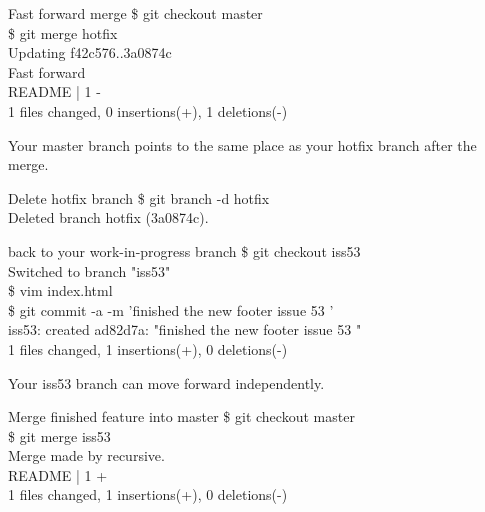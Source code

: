 \documentclass{beamer}
\begin{document}
\begin{frame}{Fast forward merge}
  \$ git checkout master\\
  \$ git merge hotfix\\
  Updating f42c576..3a0874c\\
  Fast forward\\
   README |    1 -\\
   1 files changed, 0 insertions(+), 1 deletions(-)
\end{frame}


\begin{frame}{Your master branch points to the same place as your hotfix branch after the merge.}
    \centering
    \hfill\vfill
\end{frame}

\begin{frame}{Delete hotfix branch}
  \$ git branch -d hotfix\\
  Deleted branch hotfix (3a0874c).
\end{frame}

\begin{frame}{back to your work-in-progress branch}
  \$ git checkout iss53\\
  Switched to branch "iss53"\\
  \$ vim index.html\\
  \$ git commit -a -m 'finished the new footer  issue 53 '\\
  iss53: created ad82d7a: "finished the new footer  issue 53 "\\
   1 files changed, 1 insertions(+), 0 deletions(-)
\end{frame}

\begin{frame}{Your iss53 branch can move forward independently.}
    \centering
    \hfill\vfill
\end{frame}

\begin{frame}{Merge finished feature into master}
  \$ git checkout master\\
  \$ git merge iss53\\
  Merge made by recursive.\\
   README |    1 +\\
   1 files changed, 1 insertions(+), 0 deletions(-)
\end{frame}
\end{document}
